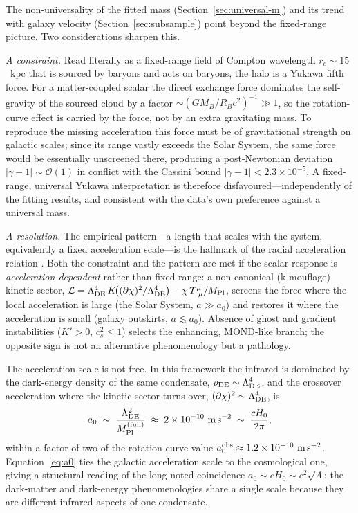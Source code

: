 \documentclass[11pt,a4paper]{article}
\begin{document}
The non-universality of the fitted mass (Section~\ref{sec:universal-m})
and its trend with galaxy velocity (Section~\ref{sec:subsample}) point
beyond the fixed-range picture. Two considerations sharpen this.

\emph{A constraint.} Read literally as a fixed-range field of Compton
wavelength $r_c \sim 15$~kpc that is sourced by baryons and acts on
baryons, the halo is a Yukawa fifth force. For a matter-coupled
scalar the direct exchange force dominates the self-gravity of the
sourced cloud by a factor $\sim (G M_B/R_B c^2)^{-1} \gg 1$, so the
rotation-curve effect is carried by the force, not by an extra
gravitating mass. To reproduce the missing acceleration this force
must be of gravitational strength on galactic scales; since its range
vastly exceeds the Solar System, the same force would be essentially
unscreened there, producing a post-Newtonian deviation
$|\gamma-1|\sim\mathcal{O}(1)$ in conflict with the Cassini bound
$|\gamma-1| < 2.3\times10^{-5}$. A fixed-range, universal Yukawa
interpretation is therefore disfavoured---independently of the
fitting results, and consistent with the data's own preference
against a universal mass.

\emph{A resolution.} The empirical pattern---a length that scales with
the system, equivalently a fixed acceleration scale---is the hallmark
of the radial acceleration relation
\cite{McGaugh:2016leg,Lelli:2017vgz}. Both the constraint and the
pattern are met if the scalar response is \emph{acceleration
dependent} rather than fixed-range: a non-canonical (k-mouflage)
kinetic sector, $\mathcal{L} = \Lambda_{\rm DE}^4\,
K\!\big((\partial\chi)^2/\Lambda_{\rm DE}^4\big) - \chi\,
T^\mu_{\ \mu}/M_{\rm Pl}$, screens the force where the local
acceleration is large (the Solar System, $a \gg a_0$) and restores it
where the acceleration is small (galaxy outskirts, $a \lesssim a_0$).
Absence of ghost and gradient instabilities ($K' > 0$, $c_s^2 \le 1$)
selects the enhancing, MOND-like branch; the opposite sign is not an
alternative phenomenology but a pathology.

The acceleration scale is not free. In this framework the infrared is
dominated by the dark-energy density of the same condensate,
$\rho_{\rm DE}\sim\Lambda_{\rm DE}^4$, and the crossover acceleration
where the kinetic sector turns over,
$(\partial\chi)^2\sim\Lambda_{\rm DE}^4$, is
\begin{equation}
a_0 \;\sim\; \frac{\Lambda_{\rm DE}^2}{M_{\rm Pl}^{\rm (full)}}
\;\approx\; 2\times10^{-10}\ \mathrm{m\,s^{-2}}
\;\sim\; \frac{cH_0}{2\pi},
\label{eq:a0}
\end{equation}
within a factor of two of the rotation-curve value
$a_0^{\rm obs}\approx1.2\times10^{-10}\ \mathrm{m\,s^{-2}}$.
Equation~\eqref{eq:a0} ties the galactic acceleration scale to the
cosmological one, giving a structural reading of the long-noted
coincidence $a_0\sim cH_0\sim c^2\sqrt{\Lambda}$: the dark-matter and
dark-energy phenomenologies share a single scale because they are
different infrared aspects of one condensate.
\end{document}
